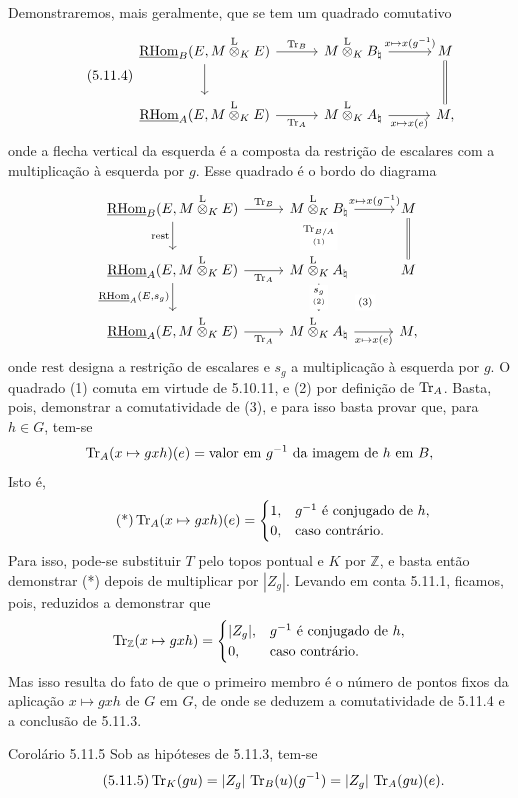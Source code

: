 Demonstraremos, mais geralmente, que se tem um quadrado comutativo
\begin{equation}\tag{5.11.4}
\begin{tikzcd}[column sep=3.0em,row sep=2.2em]
\uRHom_B(E,M\lten_KE) \arrow[r,"\Tr_B"] \arrow[d] &
M\lten_KB_\natural \arrow[r,"{x\mapsto x(g^{-1})}"] &
M \arrow[d,equal] \\
\uRHom_A(E,M\lten_KE) \arrow[r,"\Tr_A"'] &
M\lten_KA_\natural \arrow[r,"{x\mapsto x(e)}"'] &
M,
\end{tikzcd}
\end{equation}
onde a flecha vertical da esquerda é a composta da restrição de escalares com a multiplicação à esquerda por $g$. Esse quadrado é o bordo do diagrama
\[
\begin{tikzcd}[column sep=2.8em,row sep=2.0em]
\uRHom_B(E,M\lten_KE) \arrow[r,"\Tr_B"] \arrow[d,"\mathrm{rest}"'] &
M\lten_KB_\natural \arrow[r,"{x\mapsto x(g^{-1})}"] \arrow[d,"{\underset{(1)}{\Tr_{B/A}}}" description] &
M \arrow[d,equal] \\
\uRHom_A(E,M\lten_KE) \arrow[r,"\Tr_A"'] \arrow[d,"{\uRHom_A(E,s_g)}"'] &
M\lten_KA_\natural \arrow[d,"{\underset{(2)}{s_g}}" description] \arrow[dr,phantom,"\scriptstyle(3)" description] &
M \\
\uRHom_A(E,M\lten_KE) \arrow[r,"\Tr_A"'] &
M\lten_KA_\natural \arrow[r,"{x\mapsto x(e)}"'] &
M,
\end{tikzcd}
\]
onde $\mathrm{rest}$ designa a restrição de escalares e $s_g$ a multiplicação à esquerda por $g$. O quadrado (1) comuta em virtude de 5.10.11, e (2) por definição de $\operatorname{Tr}_A$. Basta, pois, demonstrar a comutatividade de (3), e para isso basta provar que, para $h\in G$, tem-se
\[
\operatorname{Tr}_A(x\mapsto gxh)(e)=\text{valor em }g^{-1}\text{ da imagem de }h\text{ em }B,
\]
Isto é,
\begin{equation}\tag{*}
\operatorname{Tr}_A(x\mapsto gxh)(e)=
\begin{cases}
1,& g^{-1}\text{ é conjugado de }h,\\
0,& \text{caso contrário}.
\end{cases}
\end{equation}
Para isso, pode-se substituir $T$ pelo topos pontual e $K$ por $\mathbb Z$, e basta então demonstrar (*) depois de multiplicar por $|Z_g|$. Levando em conta 5.11.1, ficamos, pois, reduzidos a demonstrar que
\[
\operatorname{Tr}_{\mathbb Z}(x\mapsto gxh)=
\begin{cases}
|Z_g|,& g^{-1}\text{ é conjugado de }h,\\
0,& \text{caso contrário}.
\end{cases}
\]
Mas isso resulta do fato de que o primeiro membro é o número de pontos fixos da aplicação $x\mapsto gxh$ de $G$ em $G$, de onde se deduzem a comutatividade de 5.11.4 e a conclusão de 5.11.3.

\begin{statement}{Corolário 5.11.5}
Sob as hipóteses de 5.11.3, tem-se
\begin{equation}\tag{5.11.5}
\operatorname{Tr}_K(gu)=|Z_g|\,\operatorname{Tr}_B(u)(g^{-1})=|Z_g|\,\operatorname{Tr}_A(gu)(e).
\end{equation}
\end{statement}
